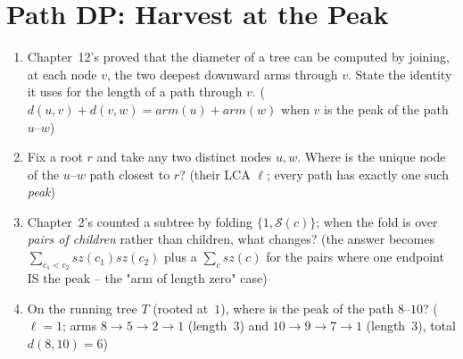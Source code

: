 \section{Path DP: Harvest at the Peak}\label{sec:c10-harvest}

\begin{previouslybox}
\begin{enumerate}[nosep, leftmargin=1.6em]
  \item Chapter~12's  proved that the diameter of a tree
        can be computed by joining, at each node $v$, the two deepest
        downward arms through $v$. State the identity it uses for the
        length of a path through $v$. ($d(u,v)+d(v,w)=\mathit{arm}(u)+\mathit{arm}(w)$
        when $v$ is the peak of the path $u$--$w$)
  \item Fix a root $r$ and take any two distinct nodes $u, w$. Where is the
        unique node of the $u$--$w$ path closest to $r$? (their LCA
        $\ell$; every path has exactly one such \emph{peak})
  \item Chapter~2's  counted a subtree by
        folding $\{1,\mathcal S(c)\}$; when the fold is over
        \emph{pairs of children} rather than children, what changes?
        (the answer becomes $\sum_{c_1<c_2}\mathit{sz}(c_1)\mathit{sz}(c_2)$
        plus a $\sum_c\mathit{sz}(c)$ for the pairs where one endpoint
        IS the peak -- the "arm of length zero" case)
  \item On the running tree $T$ (rooted at~$1$), where is the peak of the
        path $8$--$10$? ($\ell=1$; arms $8\to5\to2\to1$ (length~$3$) and
        $10\to9\to7\to1$ (length~$3$), total $d(8,10)=6$)
\end{enumerate}
\end{previouslybox}

